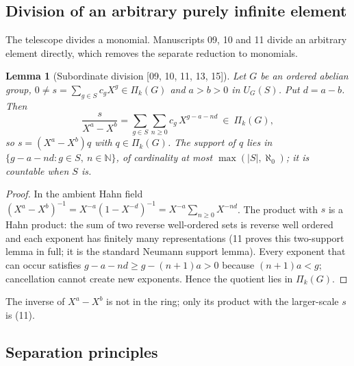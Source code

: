 \documentclass[11pt,letterpaper]{article}
\numberwithin{equation}{section}
\newtheorem{lemma}[lemma]{Lemma}
\theoremstyle{definition}
\theoremstyle{remark}
\theoremstyle{plain}
\newcommand{\N}{\mathbb N}
\newcommand{\src}[1]{\textup{\textsf{[#1]}}}
\begin{document}
\subsection{Division of an arbitrary purely infinite element}\label{osq:sub:division}

The telescope divides a monomial. Manuscripts 09, 10 and 11 divide an arbitrary element
directly, which removes the separate reduction to monomials.

\begin{lemma}[Subordinate division \src{09, 10, 11, 13, 15}]\label{osq:lem:division}
Let $G$ be an ordered abelian group, $0\ne s=\sum_{g\in S}c_gX^g\in\Pi_k(G)$ and
$a>b>0$ in $U_G(S)$. Put $d=a-b$. Then
\begin{equation}\label{osq:eq:division}
 \frac{s}{X^a-X^b}=\sum_{g\in S}\sum_{n\ge0}c_g\,X^{g-a-nd}\ \in\ \Pi_k(G),
\end{equation}
so $s=(X^a-X^b)q$ with $q\in\Pi_k(G)$. The support of $q$ lies in
$\{g-a-nd:g\in S,\ n\in\N\}$, of cardinality at most $\max(|S|,\aleph_0)$; it is
countable when $S$ is.
\end{lemma}
\begin{proof}
In the ambient Hahn field $(X^a-X^b)^{-1}=X^{-a}(1-X^{-d})^{-1}=X^{-a}\sum_{n\ge0}X^{-nd}$.
The product with $s$ is a Hahn product: the sum of two reverse well-ordered sets is reverse
well ordered and each exponent has finitely many representations (11 proves this two-support
lemma in full; it is the standard Neumann support lemma). Every exponent that can occur
satisfies $g-a-nd\ge g-(n+1)a>0$ because $(n+1)a<g$; cancellation cannot create new
exponents. Hence the quotient lies in $\Pi_k(G)$.
\end{proof}

The inverse of $X^a-X^b$ is not in the ring; only its product with the larger-scale $s$ is
(11).

\subsection{Separation principles}\label{osq:sub:separation}
\end{document}
